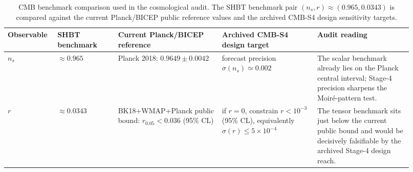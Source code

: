 \documentclass[11pt]{article}
\begin{document}
\begin{table}[t]
\centering
\scriptsize
\setlength{\tabcolsep}{3pt}
\renewcommand{\arraystretch}{1.12}
\begin{tabular}{@{}>{\raggedright\arraybackslash}p{0.10\linewidth}>{\raggedright\arraybackslash}p{0.14\linewidth}>{\raggedright\arraybackslash}p{0.24\linewidth}>{\raggedright\arraybackslash}p{0.22\linewidth}>{\raggedright\arraybackslash}p{0.22\linewidth}@{}}
\toprule
Observable & SHBT benchmark & Current Planck/BICEP reference & Archived CMB-S4 design target & Audit reading \\
\midrule
$n_s$ & $\approx 0.965$ & Planck 2018: $0.9649\pm0.0042$ & forecast precision $\sigma(n_s)\simeq 0.002$ & The scalar benchmark already lies on the Planck central interval; Stage-4 precision sharpens the Moir\'e-pattern test. \\

$r$ & $\approx 0.0343$ & BK18+WMAP+Planck public bound: $r_{0.05}<0.036$ (95\% CL) & if $r=0$, constrain $r<10^{-3}$ (95\% CL), equivalently $\sigma(r)\le 5\times10^{-4}$ & The tensor benchmark sits just below the current public bound and would be decisively falsifiable by the archived Stage-4 design reach. \\
\bottomrule
\end{tabular}
\caption{CMB benchmark comparison used in the cosmological audit. The SHBT benchmark pair $(n_s,r)\approx(0.965,0.0343)$ is compared against the current Planck/BICEP public reference values and the archived CMB-S4 design sensitivity targets.}
\label{tab:s25-cmb-benchmarks}
\end{table}
\end{document}
